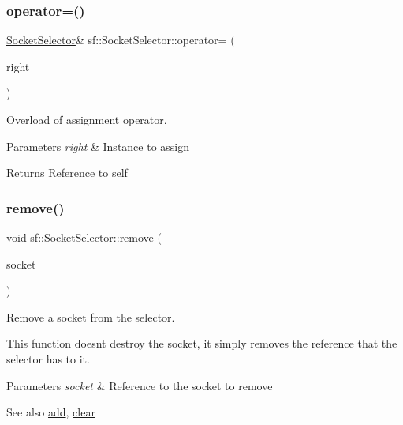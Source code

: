 \subsubsection{\texorpdfstring{operator=()}{operator=()}}
{\footnotesize\ttfamily \hyperlink{classsf_1_1_socket_selector}{Socket\+Selector}\& sf\+::\+Socket\+Selector\+::operator= (\begin{DoxyParamCaption}\item[{const \hyperlink{classsf_1_1_socket_selector}{Socket\+Selector} \&}]{right }\end{DoxyParamCaption})}



Overload of assignment operator. 


\begin{DoxyParams}{Parameters}
{\em right} & Instance to assign\\
\hline
\end{DoxyParams}
\begin{DoxyReturn}{Returns}
Reference to self 
\end{DoxyReturn}
\mbox{\label{classsf_1_1_socket_selector_a98b6ab693a65b82caa375639232357c1}} 
\subsubsection{\texorpdfstring{remove()}{remove()}}
{\footnotesize\ttfamily void sf\+::\+Socket\+Selector\+::remove (\begin{DoxyParamCaption}\item[{\hyperlink{classsf_1_1_socket}{Socket} \&}]{socket }\end{DoxyParamCaption})}



Remove a socket from the selector. 

This function doesn\textquotesingle{}t destroy the socket, it simply removes the reference that the selector has to it.


\begin{DoxyParams}{Parameters}
{\em socket} & Reference to the socket to remove\\
\hline
\end{DoxyParams}
\begin{DoxySeeAlso}{See also}
\hyperlink{classsf_1_1_socket_selector_ade952013232802ff7b9b33668f8d2096}{add}, \hyperlink{classsf_1_1_socket_selector_a76e650acb0199d4be91e90a493fbc91a}{clear} 
\end{DoxySeeAlso}
\mbox{\label{classsf_1_1_socket_selector_a9cfda5475f17925e65889394d70af702}} 
